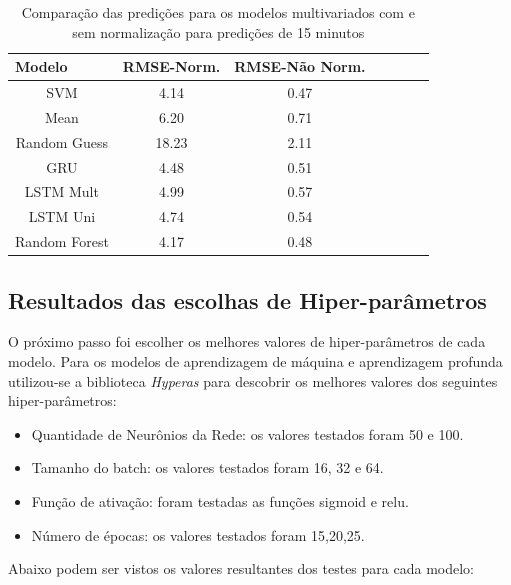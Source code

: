 \begin{table}[H]
    \caption{Comparação das predições para os modelos multivariados com e sem normalização para predições de 15 minutos}
    \label{table:RmseComparison}
    \begin{center}
    \begin{tabular}{ccccccc}
    \hline
    \multicolumn{1}{l}{\textbf{Modelo}} & \multicolumn{1}{l}{\textbf{RMSE-Norm.}} & \multicolumn{1}{l}{\textbf{RMSE-Não Norm.}}\\
    \hline
    SVM & 4.14 & 0.47  \\
    Mean & 6.20 & 0.71  \\
    Random Guess & 18.23 & 2.11\\
    GRU & 4.48 & 0.51  \\ 
    LSTM Mult & 4.99 &  0.57  \\ 
    LSTM Uni & 4.74 &  0.54  \\ 
    Random Forest & 4.17 & 0.48 \\
    \hline
    \end{tabular}
    \end{center}
\end{table}

\subsection{Resultados das escolhas de Hiper-parâmetros}

O próximo passo foi escolher os melhores valores de hiper-parâmetros de cada modelo. Para os modelos de aprendizagem de máquina e aprendizagem profunda utilizou-se a biblioteca \textit{Hyperas} para descobrir os melhores valores dos seguintes hiper-parâmetros:

\begin{itemize}
	\item Quantidade de Neurônios da Rede: os valores testados foram 50 e 100.
	\item Tamanho do batch: os valores testados foram 16, 32 e 64.
	\item Função de ativação: foram testadas as funções sigmoid e relu.
	\item Número de épocas: os valores testados foram 15,20,25.
\end{itemize}

Abaixo podem ser vistos os valores resultantes dos testes para cada modelo:

